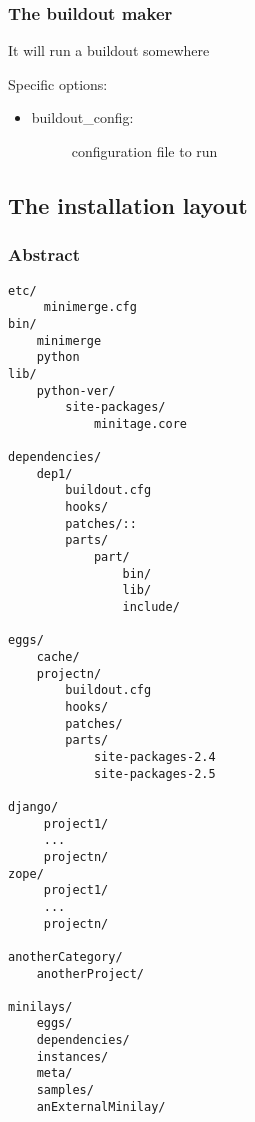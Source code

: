 \documentclass[letterpaper,10pt,english]{sphinxmanual}
\begin{document}
\subsubsection{The buildout maker}
\label{spec:the-buildout-maker}\label{spec:buildout-maker}
It will run a buildout somewhere

Specific options:
\begin{itemize}
\item {} \begin{description}
\item[{buildout\_config:}] \leavevmode
configuration file  to run

\end{description}

\end{itemize}


\subsection{The installation layout}
\label{spec:the-installation-layout}

\subsubsection{Abstract}
\label{spec:id2}
\begin{Verbatim}[commandchars=@\[\]]
etc/
     minimerge.cfg
bin/
    minimerge
    python
lib/
    python-ver/
        site-packages/
            minitage.core

dependencies/
    dep1/
        buildout.cfg
        hooks/
        patches/::
        parts/
            part/
                bin/
                lib/
                include/

eggs/
    cache/
    projectn/
        buildout.cfg
        hooks/
        patches/
        parts/
            site-packages-2.4
            site-packages-2.5

django/
     project1/
     ...
     projectn/
zope/
     project1/
     ...
     projectn/

anotherCategory/
    anotherProject/

minilays/
    eggs/
    dependencies/
    instances/
    meta/
    samples/
    anExternalMinilay/
\end{Verbatim}
\end{document}

